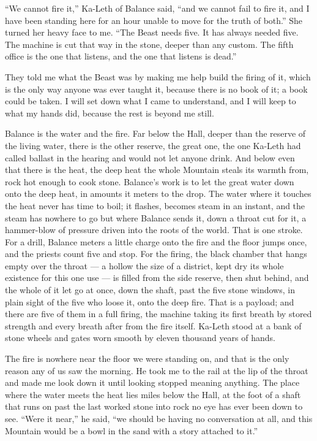 ``We cannot fire it,'' Ka-Leth of Balance said, ``and we cannot fail to fire it, and I have been standing here for an hour unable to move for the truth of both.'' She turned her heavy face to me. ``The Beast needs five. It has always needed five. The machine is cut that way in the stone, deeper than any custom. The fifth office is the one that listens, and the one that listens is dead.''\par

\ornament

They told me what the Beast was by making me help build the firing of it, which is the only way anyone was ever taught it, because there is no book of it; a book could be taken. I will set down what I came to understand, and I will keep to what my hands did, because the rest is beyond me still.\par

Balance is the water and the fire. Far below the Hall, deeper than the reserve of the living water, there is the other reserve, the great one, the one Ka-Leth had called ballast in the hearing and would not let anyone drink. And below even that there is the heat, the deep heat the whole Mountain steals its warmth from, rock hot enough to cook stone. Balance's work is to let the great water down onto the deep heat, in amounts it meters to the drop. The water where it touches the heat never has time to boil; it flashes, becomes steam in an instant, and the steam has nowhere to go but where Balance sends it, down a throat cut for it, a hammer-blow of pressure driven into the roots of the world. That is one stroke. For a drill, Balance meters a little charge onto the fire and the floor jumps once, and the priests count five and stop. For the firing, the black chamber that hangs empty over the throat --- a hollow the size of a district, kept dry its whole existence for this one use --- is filled from the side reserve, then shut behind, and the whole of it let go at once, down the shaft, past the five stone windows, in plain sight of the five who loose it, onto the deep fire. That is a payload; and there are five of them in a full firing, the machine taking its first breath by stored strength and every breath after from the fire itself. Ka-Leth stood at a bank of stone wheels and gates worn smooth by eleven thousand years of hands.\par

The fire is nowhere near the floor we were standing on, and that is the only reason any of us saw the morning. He took me to the rail at the lip of the throat and made me look down it until looking stopped meaning anything. The place where the water meets the heat lies miles below the Hall, at the foot of a shaft that runs on past the last worked stone into rock no eye has ever been down to see. ``Were it near,'' he said, ``we should be having no conversation at all, and this Mountain would be a bowl in the sand with a story attached to it.''\par

